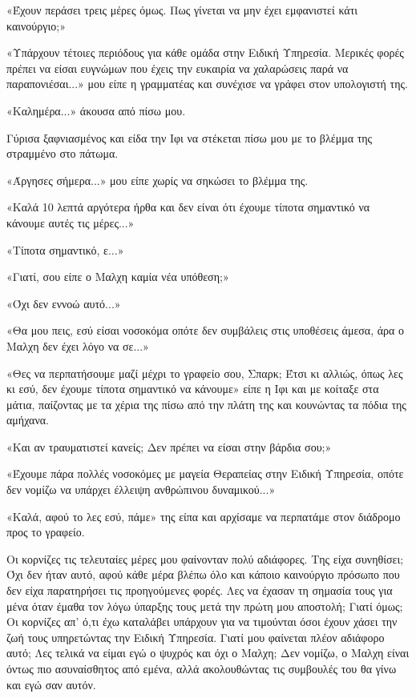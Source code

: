 \documentclass[12pt,twoside, openany]{book}
\begin{document}
«Έχουν περάσει τρεις μέρες όμως. Πως γίνεται να μην έχει εμφανιστεί κάτι καινούργιο;»

«Υπάρχουν τέτοιες περιόδους για κάθε ομάδα στην Ειδική Υπηρεσία. Μερικές φορές πρέπει να είσαι ευγνώμων που έχεις την ευκαιρία να χαλαρώσεις παρά να παραπονιέσαι...» μου είπε η γραμματέας και συνέχισε να γράφει στον υπολογιστή της.

«Καλημέρα...» άκουσα από πίσω μου.

Γύρισα ξαφνιασμένος και είδα την Ιφι να στέκεται πίσω μου με το βλέμμα της στραμμένο στο πάτωμα.

«Άργησες σήμερα...» μου είπε χωρίς να σηκώσει το βλέμμα της.

«Καλά 10 λεπτά αργότερα ήρθα και δεν είναι ότι έχουμε τίποτα σημαντικό να κάνουμε αυτές τις μέρες...»

«Τίποτα σημαντικό, ε...»

«Γιατί, σου είπε ο Μαλχη καμία νέα υπόθεση;»

«Όχι δεν εννοώ αυτό...»

«Θα μου πεις, εσύ είσαι νοσοκόμα οπότε δεν συμβάλεις στις υποθέσεις άμεσα, άρα ο Μαλχη δεν έχει λόγο να σε...»

«Θες να περπατήσουμε μαζί μέχρι το γραφείο σου, Σπαρκ; Έτσι κι αλλιώς, όπως λες κι εσύ, δεν έχουμε τίποτα σημαντικό να κάνουμε» είπε η Ιφι και με κοίταξε στα μάτια, παίζοντας με τα χέρια της πίσω από την πλάτη της και κουνώντας τα πόδια της αμήχανα.

«Και αν τραυματιστεί κανείς; Δεν πρέπει να είσαι στην βάρδια σου;»

«Έχουμε πάρα πολλές νοσοκόμες με μαγεία Θεραπείας στην Ειδική Υπηρεσία, οπότε δεν νομίζω να υπάρχει έλλειψη ανθρώπινου δυναμικού...»

«Καλά, αφού το λες εσύ, πάμε» της είπα και αρχίσαμε να περπατάμε στον διάδρομο προς το γραφείο.

Οι κορνίζες τις τελευταίες μέρες μου φαίνονταν πολύ αδιάφορες. Της είχα συνηθίσει; Όχι δεν ήταν αυτό, αφού κάθε μέρα βλέπω όλο και κάποιο καινούργιο πρόσωπο που δεν είχα παρατηρήσει τις προηγούμενες φορές. Λες να έχασαν τη σημασία τους για μένα όταν έμαθα τον λόγω ύπαρξης τους μετά την πρώτη μου αποστολή; Γιατί όμως; Οι κορνίζες απ’ ό,τι έχω καταλάβει υπάρχουν για να τιμούνται όσοι έχουν χάσει την ζωή τους υπηρετώντας την Ειδική Υπηρεσία. Γιατί μου φαίνεται πλέον αδιάφορο αυτό; Λες τελικά να είμαι εγώ ο ψυχρός και όχι ο Μαλχη; Δεν νομίζω, ο Μαλχη είναι όντως πιο ασυναίσθητος από εμένα, αλλά ακολουθώντας τις συμβουλές του θα γίνω και εγώ σαν αυτόν.
\end{document}
